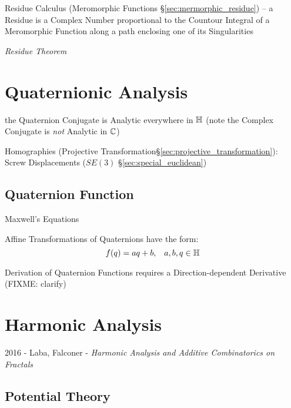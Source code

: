 Residue Calculus (Meromorphic Functions \S\ref{sec:mermorphic_residue}) -- a
Residue is a Complex Number proportional to the Countour Integral of a
Meromorphic Function along a path enclosing one of its Singularities

\emph{Residue Theorem}



\section{Quaternionic Analysis}\label{sec:quaternionic_analysis}

the Quaternion Conjugate is Analytic everywhere in $\mathbb{H}$
(note the Complex Conjugate is \emph{not} Analytic in $\mathbb{C}$)

Homographies (Projective Transformation\S\ref{sec:projective_transformation}):
Screw Displacements ($SE(3)$ \S\ref{sec:special_euclidean})



\subsection{Quaternion Function}\label{sec:quaternion_function}

Maxwell's Equations

Affine Transformations of Quaternions have the form:
\[
  f(q) = aq + b, \;\;\; a,b,q \in \mathbb{H}
\]

Derivation of Quaternion Functions requires a Direction-dependent Derivative
(FIXME: clarify)



\section{Harmonic Analysis}\label{sec:harmonic_analysis}

2016 - Laba, Falconer - \emph{Harmonic Analysis and Additive Combinatorics on
  Fractals}



\subsection{Potential Theory}\label{sec:potential_theory}

